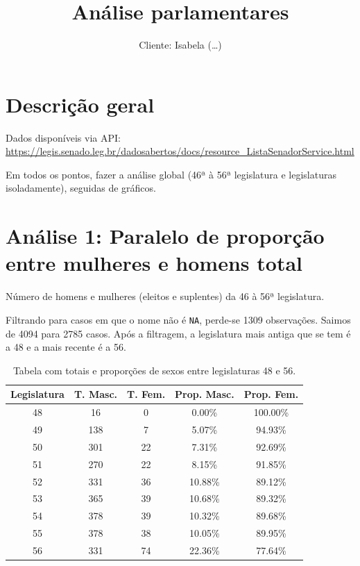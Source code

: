 \documentclass[
  letterpaper,
  DIV=11,
  numbers=noendperiod]{scrartcl}
\title{Análise parlamentares}
\subtitle{Cliente: Isabela (\ldots)}
\author{}
\date{}
\renewcommand*\contentsname{Table of contents}
\newcommand\contentsname{Table of contents}
\begin{document}
\maketitle
\ifdefined\Shaded\renewenvironment{Shaded}{\begin{tcolorbox}[breakable, frame hidden, interior hidden, boxrule=0pt, borderline west={3pt}{0pt}{shadecolor}, enhanced, sharp corners]}{\end{tcolorbox}}\fi

\renewcommand*\contentsname{Table of contents}
{
\hypersetup{linkcolor=}
\setcounter{tocdepth}{2}
\tableofcontents
}
\newpage{}

\hypertarget{descriuxe7uxe3o-geral}{%
\section{Descrição geral}\label{descriuxe7uxe3o-geral}}

Dados disponíveis via API:
\url{https://legis.senado.leg.br/dadosabertos/docs/resource_ListaSenadorService.html}

Em todos os pontos, fazer a análise global (46ª à 56ª legislatura e
legislaturas isoladamente), seguidas de gráficos.

\hypertarget{anuxe1lise-1-paralelo-de-proporuxe7uxe3o-entre-mulheres-e-homens-total}{%
\section{Análise 1: Paralelo de proporção entre mulheres e homens
total}\label{anuxe1lise-1-paralelo-de-proporuxe7uxe3o-entre-mulheres-e-homens-total}}

Número de homens e mulheres (eleitos e suplentes) da 46 à 56ª
legislatura.

Filtrando para casos em que o nome não é \texttt{NA}, perde-se 1309
observações. Saimos de 4094 para 2785 casos. Após a filtragem, a
legislatura mais antiga que se tem é a 48 e a mais recente é a 56.

\begin{longtable}{ccccc}
\caption{Tabela com totais e proporções de sexos entre legislaturas 48 e 56.}\tabularnewline

\toprule
Legislatura & T. Masc. & T. Fem. & Prop. Masc. & Prop. Fem.\\
\midrule
48 & 16 & 0 & 0.00\% & 100.00\%\\
49 & 138 & 7 & 5.07\% & 94.93\%\\
50 & 301 & 22 & 7.31\% & 92.69\%\\
51 & 270 & 22 & 8.15\% & 91.85\%\\
52 & 331 & 36 & 10.88\% & 89.12\%\\
53 & 365 & 39 & 10.68\% & 89.32\%\\
54 & 378 & 39 & 10.32\% & 89.68\%\\
55 & 378 & 38 & 10.05\% & 89.95\%\\
56 & 331 & 74 & 22.36\% & 77.64\%\\
\bottomrule
\end{longtable}
\end{document}
